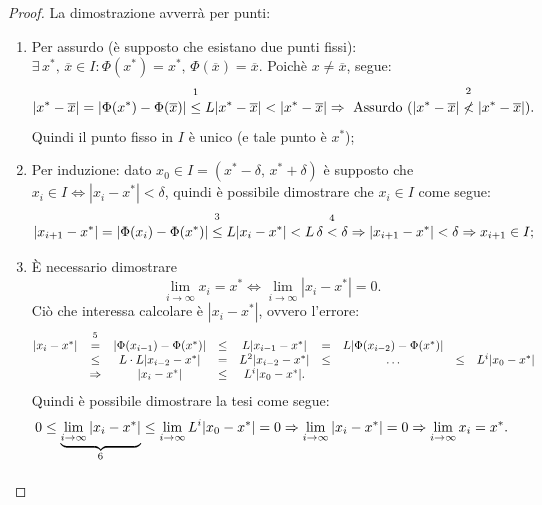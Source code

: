 \begin{proof}
	La dimostrazione avverrà per punti:
	\begin{enumerate}
		\item Per assurdo (è supposto che esistano due punti fissi): $\exists\, x^*,\, \overline{x}\in I: \Phi(x^*)=x^*,\, \Phi(\overline{x})=\overline{x}$. Poichè $x \neq \overline{x}$, segue:
		\begin{equation*}
			|x^*-\overline{x}|=|\Phi(x^*)-\Phi(\overline{x})|\overset{\footnotemark}{\leq}L|x^*-\overline{x}|<|x^*-\overline{x}| \Rightarrow\text{ Assurdo } (|x^*-\overline{x}|\overset{\footnotemark}{\nless}|x^*-\overline{x}|).
		\end{equation*}
		Quindi il punto fisso in $I$ è unico (e tale punto è $x^*$);
		\addtocounter{footnote}{-1}
		\item Per induzione: dato $x_0 \in I = (x^*-\delta,\, x^* + \delta)$ è supposto che $x_i\in I \iff |x_i-x^*|<\delta$, quindi è possibile dimostrare che $x_i\in I$ come segue:
		\begin{equation*}
			|x_{i+1}-x^*|=|\Phi(x_i)-\Phi(x^*)|\overset{\footnotemark}{\leq}L|x_i - x^*| < L\,\delta\overset{\footnotemark}{<}\delta\Rightarrow |x_{i+1}-x^*|<\delta\Rightarrow x_{i+1}\in I;
		\end{equation*}
		\item È necessario dimostrare
		\begin{equation*}
			\lim_{i\to\infty}{x_i}=x^*\iff \lim_{i\to\infty}{|x_i-x^*|}=0.
		\end{equation*}
		Ciò che interessa calcolare è $|x_i-x^*|$, ovvero l'errore:
		\begin{equation*}
			\begin{matrix}
				|x_i-x^*|&\overset{\footnotemark}{=}&|\Phi(x_{i-1})-\Phi(x^*)|&\leq& L|x_{i-1}-x^*|&=& L|\Phi(x_{i-2})-\Phi(x^*)|\\
				&\leq& L\cdot L |x_{i-2}-x^*|&=& L^2|x_{i-2}-x^*|&\leq& \hdots &\leq& L^i|x_0-x^*|\\
				&\Rightarrow& |x_i-x^*|&\leq& L^i|x_0-x^*|.
			\end{matrix}
		\end{equation*}
		Quindi è possibile dimostrare la tesi come segue:
		\begin{equation*}
			0\leq \underbrace{\lim_{i \to\infty}{|x_i-x^*|}}_{\footnotemark}\leq\lim_{i\to\infty}{L^i|x_0-x^*|}=0\Rightarrow \lim_{i\to\infty}{|x_i-x^*|}=0\Rightarrow\lim_{i\to\infty}{x_i=x^*}.
		\end{equation*}
	\end{enumerate}
\end{proof}

